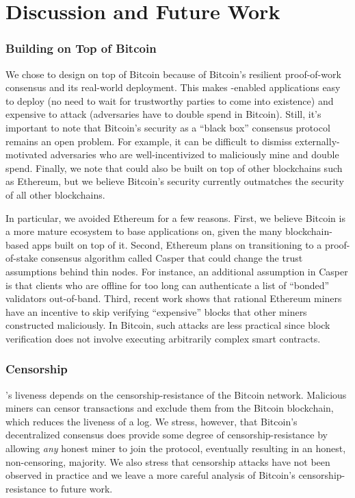 \section{Discussion and Future Work}
\label{sec:discussion}

\setcounter{subsubsection}{0}
\subsubsection{Building \Sys on Top of Bitcoin}
We chose to design \Sys on top of Bitcoin because of Bitcoin's resilient proof-of-work consensus\cite{blockchainproto} and its real-world deployment.
This makes \Sys-enabled applications easy to deploy (no need to wait for trustworthy parties to come into existence) and expensive to attack (adversaries have to double spend in Bitcoin).
Still, it's important to note that Bitcoin's security as a ``black box'' consensus protocol remains an open problem.
For example, it can be difficult to dismiss externally-motivated adversaries who are well-incentivized to maliciously mine and double spend.
Finally, we note that \Sys could also be built on top of other blockchains such as Ethereum\cite{ethereum}, but we believe Bitcoin's security currently outmatches the security of all other blockchains.

In particular, we avoided Ethereum for a few reasons.
First, we believe Bitcoin is a more mature ecosystem to base applications on, given the many blockchain-based apps built on top of it\cite{blockstack,keybase,openassets,colu,coinspark}.
Second, Ethereum plans on transitioning to a proof-of-stake consensus algorithm\cite{proof-of-stake} called Casper\cite{ethereum-casper} that could change the trust assumptions behind thin nodes.
For instance, an additional assumption in Casper is that clients who are offline for too long can authenticate a list of ``bonded'' validators out-of-band\cite{ethereum-casper}.
Third, recent work shows that rational Ethereum miners have an incentive to skip verifying ``expensive'' blocks that other miners constructed maliciously\cite{consensuscomputer}.
In Bitcoin, such attacks are less practical since block verification does not involve executing arbitrarily complex smart contracts.

\subsubsection{Censorship}
\Sys's liveness depends on the censorship-resistance of the Bitcoin network.
Malicious miners can censor \Sys transactions and exclude them from the Bitcoin blockchain, which reduces the liveness of a \Sys log.
We stress, however, that Bitcoin's decentralized consensus does provide some degree of censorship-resistance by allowing \emph{any} honest miner to join the protocol, eventually resulting in an honest, non-censoring, majority.
We also stress that censorship attacks have not been observed in practice and we leave a more careful analysis of Bitcoin's censorship-resistance to future work.

